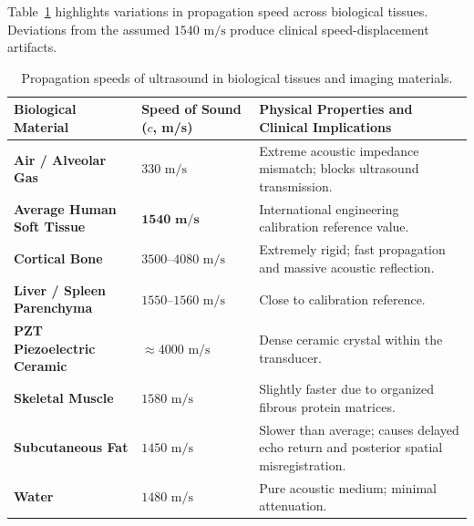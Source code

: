 \documentclass[11pt,a4paper]{article}
\begin{document}
Table~\ref{tab:sound_speeds} highlights variations in propagation speed across biological tissues. Deviations from the assumed $1540\text{ m/s}$ produce clinical speed-displacement artifacts.

\begin{table}[htbp]
\centering
\small
\renewcommand{\arraystretch}{1.2}
\begin{tabular}{p{4.5cm}p{3cm}p{7.5cm}}
\toprule
\textbf{Biological Material} & \textbf{Speed of Sound ($c$, m/s)} & \textbf{Physical Properties and Clinical Implications} \\
\midrule
\textbf{Air / Alveolar Gas} & $330\text{ m/s}$ & Extreme acoustic impedance mismatch; blocks ultrasound transmission. \\
\textbf{Average Human Soft Tissue} & $\mathbf{1540\text{ m/s}}$ & International engineering calibration reference value. \\
\textbf{Cortical Bone} & $3500\text{--}4080\text{ m/s}$ & Extremely rigid; fast propagation and massive acoustic reflection. \\
\textbf{Liver / Spleen Parenchyma} & $1550\text{--}1560\text{ m/s}$ & Close to calibration reference. \\
\textbf{PZT Piezoelectric Ceramic} & $\approx 4000\text{ m/s}$ & Dense ceramic crystal within the transducer. \\
\textbf{Skeletal Muscle} & $1580\text{ m/s}$ & Slightly faster due to organized fibrous protein matrices. \\
\textbf{Subcutaneous Fat} & $1450\text{ m/s}$ & Slower than average; causes delayed echo return and posterior spatial misregistration. \\
\textbf{Water} & $1480\text{ m/s}$ & Pure acoustic medium; minimal attenuation. \\
\bottomrule
\end{tabular}
\caption{Propagation speeds of ultrasound in biological tissues and imaging materials.}
\label{tab:sound_speeds}
\end{table}
\end{document}
